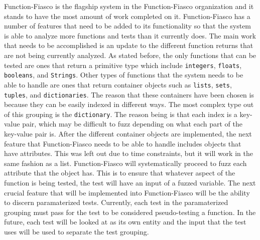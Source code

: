 Function-Fiasco is the flagship system in the Function-Fiasco organization and it stands to have the most amount of work completed on it. Function-Fiasco has a number of features that need to be added to its functionality so that the system is able to analyze more functions and tests than it currently does.
The main work that needs to be accomplished is an update to the different function returns that are not being currently analyzed. As stated before, the only functions that can be tested are ones that return a primitive type which include \texttt{integers}, \texttt{floats}, \texttt{booleans}, and \texttt{Strings}. Other types of functions that the system needs to be able to handle are ones that return container objects such as \texttt{lists}, \texttt{sets}, \texttt{tuples}, and \texttt{dictionaries}. The reason that these containers have been chosen is because they can be easily indexed in different ways. The most complex type out of this grouping is the \texttt{dictionary}. The reason being is that each index is a key-value pair, which may be difficult to fuzz depending on what each part of the key-value pair is. After the different container objects are implemented, the next feature that Function-Fiasco needs to be able to handle includes objects that have attributes. This was left out due to time constraints, but it will work in the same fashion as a list. Function-Fiasco will systematically proceed to fuzz each attribute that the object has. This is to ensure that whatever aspect of the function is being tested, the test will have an input of a fuzzed variable.
The next crucial feature that will be implemented into Function-Fiasco will be the ability to discern paramaterized tests. Currently, each test in the paramaterized grouping must pass for the test to be considered pseudo-testing a function. In the future, each test will be looked at as its own entity and the input that the test uses will be used to separate the test grouping.

